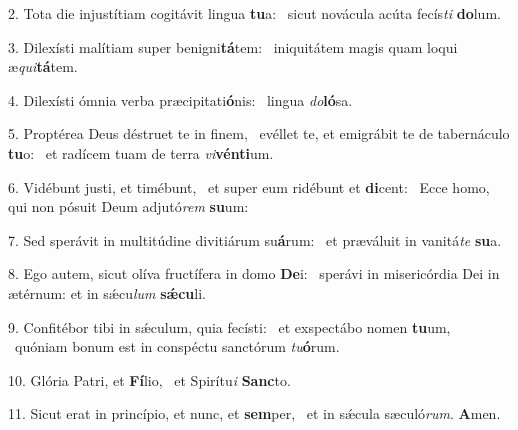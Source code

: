 2. Tota die injustítiam cogitávit lingua \textbf{tu}a: \ast\  sicut novácula acúta fecís\textit{ti} \textbf{do}lum.\

3. Dilexísti malítiam super benigni\textbf{tá}tem: \ast\  iniquitátem magis quam loqui æ\textit{qui}\textbf{tá}tem.\

4. Dilexísti ómnia verba præcipitati\textbf{ó}nis: \ast\  lingua \textit{do}\textbf{ló}sa.\

5. Proptérea Deus déstruet te in finem, \dag\  evéllet te, et emigrábit te de tabernáculo \textbf{tu}o: \ast\  et radícem tuam de terra \textit{vi}\textbf{vén}\textbf{ti}um.\

6. Vidébunt justi, et timébunt, \dag\  et super eum ridébunt et \textbf{di}cent: \ast\  Ecce homo, qui non pósuit Deum adjutó\textit{rem} \textbf{su}um:\

7. Sed sperávit in multitúdine divitiárum su\textbf{á}rum: \ast\  et præváluit in vanitá\textit{te} \textbf{su}a.\

8. Ego autem, sicut olíva fructífera in domo \textbf{De}i: \ast\  sperávi in misericórdia Dei in ætérnum: et in sǽcu\textit{lum} \textbf{sǽ}\textbf{cu}li.\

9. Confitébor tibi in sǽculum, quia fecísti: \dag\  et exspectábo nomen \textbf{tu}um, \ast\  quóniam bonum est in conspéctu sanctórum \textit{tu}\textbf{ó}rum.\

10. Glória Patri, et \textbf{Fí}lio, \ast\  et Spirítu\textit{i} \textbf{Sanc}to.\

11. Sicut erat in princípio, et nunc, et \textbf{sem}per, \ast\  et in sǽcula sæculó\textit{rum}. \textbf{A}men.\

